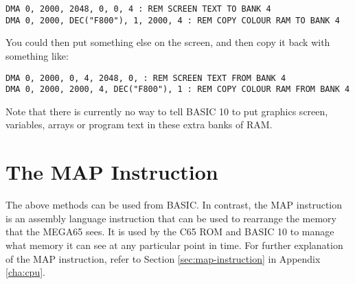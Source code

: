 \begin{tcolorbox}[colback=black,coltext=white]
\verbatimfont{\codefont}
\begin{verbatim}
DMA 0, 2000, 2048, 0, 0, 4 : REM SCREEN TEXT TO BANK 4
DMA 0, 2000, DEC("F800"), 1, 2000, 4 : REM COPY COLOUR RAM TO BANK 4
\end{verbatim}
\end{tcolorbox}

You could then put something else on the screen, and then copy it back with something like:

\begin{tcolorbox}[colback=black,coltext=white]
\verbatimfont{\codefont}
\begin{verbatim}
DMA 0, 2000, 0, 4, 2048, 0, : REM SCREEN TEXT FROM BANK 4
DMA 0, 2000, 2000, 4, DEC("F800"), 1 : REM COPY COLOUR RAM FROM BANK 4
\end{verbatim}
\end{tcolorbox}

Note that there is currently no way to tell BASIC 10 to put graphics screen, variables,
arrays or program text in these extra banks of RAM.

\section{The MAP Instruction}

The above methods can be used from BASIC. In contrast, the MAP instruction is an assembly
language instruction that can be used to rearrange the memory that the MEGA65 sees.
It is used by the C65 ROM and BASIC 10 to manage what memory it can see at any particular
point in time.  For further explanation of the MAP instruction, refer to Section \ref{sec:map-instruction} in Appendix \ref{cha:cpu}.



